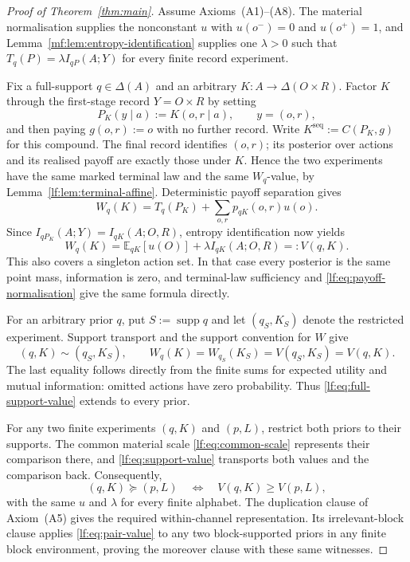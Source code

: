 \documentclass[11pt,a4paper]{article}
\theoremstyle{definition}
\newcommand{\D}{\Delta}
\newcommand{\E}{\mathbb E}
\newcommand{\supp}{\operatorname{supp}}
\newcommand{\1}{\mathbf 1}
\begin{document}
\begin{proof}[Proof of Theorem~\ref{thm:main}]
Assume Axioms~\textup{(A1)--(A8)}.  The material normalisation supplies the
nonconstant $u$ with $u(o^-)=0$ and $u(o^+)=1$, and
Lemma~\ref{mf:lem:entropy-identification} supplies one $\lambda>0$ such that
$T_q(P)=\lambda I_{qP}(A;Y)$ for every finite record experiment.

Fix a full-support $q\in\D(A)$ and an arbitrary
$K:A\to\D(O\times R)$.  Factor $K$ through the first-stage record
$Y=O\times R$ by setting
\[
P_K(y\mid a):=K(o,r\mid a),\qquad y=(o,r),
\]
and then paying $g(o,r):=o$ with no further record.  Write
$K^{\mathrm{seq}}:=C(P_K,g)$ for this compound.  The final record identifies
$(o,r)$; its posterior over actions and its realised payoff are exactly those
under $K$.  Hence the two experiments have the same marked terminal law and
the same $W_q$-value, by Lemma~\ref{lf:lem:terminal-affine}.
Deterministic payoff separation gives
\[
W_q(K)=T_q(P_K)+\sum_{o,r}p_{qK}(o,r)u(o).
\]
Since $I_{qP_K}(A;Y)=I_{qK}(A;O,R)$, entropy identification now yields
\begin{equation}
W_q(K)=\E_{qK}[u(O)]+\lambda I_{qK}(A;O,R)=:V(q,K).
\label{lf:eq:full-support-value}
\end{equation}
This also covers a singleton action set.  In that case every posterior is
the same point mass, information is zero, and terminal-law sufficiency and
\eqref{lf:eq:payoff-normalisation} give the same formula directly.

For an arbitrary prior $q$, put $S:=\supp q$ and let $(q_S,K_S)$ denote
the restricted experiment.  Support transport and the support convention
for $W$ give
\begin{equation}
(q,K)\sim(q_S,K_S),\qquad
W_q(K)=W_{q_S}(K_S)=V(q_S,K_S)=V(q,K).
\label{lf:eq:support-value}
\end{equation}
The last equality follows directly from the finite sums for expected utility
and mutual information: omitted actions have zero probability.  Thus
\eqref{lf:eq:full-support-value} extends to every prior.

For any two finite experiments $(q,K)$ and $(p,L)$, restrict both priors to
their supports.  The common material scale
\eqref{lf:eq:common-scale} represents their comparison there, and
\eqref{lf:eq:support-value} transports both values and the comparison back.
Consequently,
\begin{equation}
(q,K)\succeq(p,L)
\quad\Longleftrightarrow\quad
V(q,K)\ge V(p,L),
\label{lf:eq:pair-value}
\end{equation}
with the same $u$ and $\lambda$ for every finite alphabet.  The duplication
clause of Axiom~\textup{(A5)} gives the required within-channel
representation.  Its irrelevant-block clause applies
\eqref{lf:eq:pair-value} to any two block-supported priors in any finite
block environment, proving the moreover clause with these same witnesses.


\end{proof}
\end{document}
